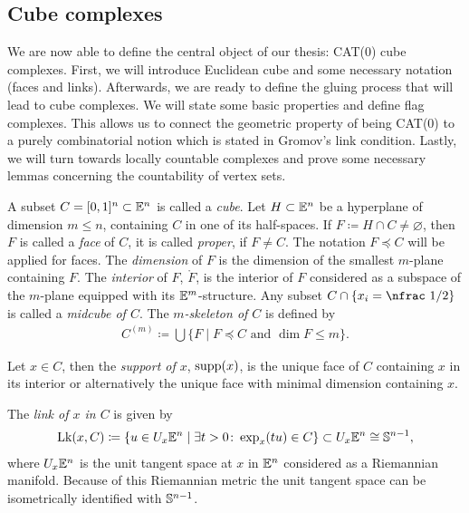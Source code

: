 \subsection{Cube complexes}
\label{sec:complex}

We are now able to define the central object of our thesis: CAT(0) cube complexes. First, we will introduce Euclidean cube and some necessary notation (faces and links). Afterwards, we are ready to define the gluing process that will lead to cube complexes. We will state some basic properties and define flag complexes. This allows us to connect the geometric property of being CAT(0) to a purely combinatorial notion which is stated in Gromov's link condition. Lastly, we will turn towards locally countable complexes and prove some necessary lemmas concerning the countability of vertex sets.

\begin{defin}[Cubes]
  A subset \(C = [0,1]^n \subset \mathbb{E}^n\) is called a \emph{cube}. Let \(H \subset \mathbb{E}^n\)  be a hyperplane of dimension \(m \leq n\), containing \(C\) in one of its half-spaces. If \(F \coloneqq H \cap C \neq \varnothing\), then \(F\) is called a \emph{face} of \(C\), it is called \emph{proper}, if \(F \neq C\). The notation \(F \preceq C\) will be applied for faces. The \emph{dimension} of \(F\) is the dimension of the smallest \(m\)-plane containing \(F\). The \emph{interior} of \(F\), \(\mathring F\), is the interior of \(F\) considered as a subspace of the \(m\)-plane equipped with its \(\mathbb{E}^m\)-structure. Any subset \(C \cap \{x_i = \text{\nfrac 1/2}\}\) is called a \emph{midcube of \(C\)}. The \emph{\(m\)-skeleton of \(C\)} is defined by
  \begin{align*}
    C^{(m)} \coloneqq \bigcup \{F \mid F \preceq C \text{ and } \dim F \leq m\}.
  \end{align*}

  Let \(x \in C\), then the \emph{support of \(x\)}, \(\operatorname{supp}(x)\), is the unique face of \(C\) containing \(x\) in its interior or alternatively the unique face with minimal dimension containing \(x\).

  The \emph{link of \(x\) in \(C\)} is given by
  \begin{align*}
    \operatorname{Lk}(x,C) \coloneqq \{u \in U_x\mathbb{E}^n \mid \exists t > 0 \colon \exp_x(tu) \in C\} \subset U_x\mathbb{E}^n \cong \mathbb{S}^{n-1},
  \end{align*}
  where \(U_x\mathbb{E}^n\) is the unit tangent space at \(x\) in \(\mathbb{E}^n\) considered as a Riemannian manifold. Because of this Riemannian metric the unit tangent space can be isometrically identified with \(\mathbb{S}^{n-1}\).
\end{defin}

